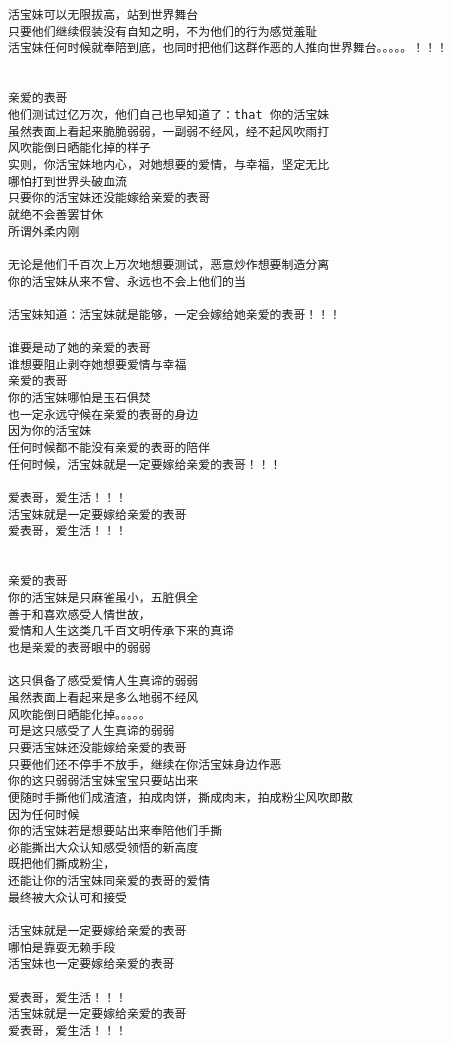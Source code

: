 \documentclass[9pt, b5paper]{article}
\begin{document}
\begin{enumerate}
\begin{verbatim}
活宝妹可以无限拔高，站到世界舞台
只要他们继续假装没有自知之明，不为他们的行为感觉羞耻
活宝妹任何时候就奉陪到底，也同时把他们这群作恶的人推向世界舞台。。。。。！！！


亲爱的表哥
他们测试过亿万次，他们自己也早知道了：that 你的活宝妹
虽然表面上看起来脆脆弱弱，一副弱不经风，经不起风吹雨打
风吹能倒日晒能化掉的样子
实则，你活宝妹地内心，对她想要的爱情，与幸福，坚定无比
哪怕打到世界头破血流
只要你的活宝妹还没能嫁给亲爱的表哥
就绝不会善罢甘休
所谓外柔内刚

无论是他们千百次上万次地想要测试，恶意炒作想要制造分离
你的活宝妹从来不曾、永远也不会上他们的当

活宝妹知道：活宝妹就是能够，一定会嫁给她亲爱的表哥！！！

谁要是动了她的亲爱的表哥
谁想要阻止剥夺她想要爱情与幸福
亲爱的表哥
你的活宝妹哪怕是玉石俱焚
也一定永远守候在亲爱的表哥的身边
因为你的活宝妹
任何时候都不能没有亲爱的表哥的陪伴
任何时候，活宝妹就是一定要嫁给亲爱的表哥！！！

爱表哥，爱生活！！！
活宝妹就是一定要嫁给亲爱的表哥
爱表哥，爱生活！！！


亲爱的表哥
你的活宝妹是只麻雀虽小，五脏俱全
善于和喜欢感受人情世故，
爱情和人生这类几千百文明传承下来的真谛
也是亲爱的表哥眼中的弱弱

这只俱备了感受爱情人生真谛的弱弱
虽然表面上看起来是多么地弱不经风
风吹能倒日晒能化掉。。。。。
可是这只感受了人生真谛的弱弱
只要活宝妹还没能嫁给亲爱的表哥
只要他们还不停手不放手，继续在你活宝妹身边作恶
你的这只弱弱活宝妹宝宝只要站出来
便随时手撕他们成渣渣，拍成肉饼，撕成肉末，拍成粉尘风吹即散
因为任何时候
你的活宝妹若是想要站出来奉陪他们手撕
必能撕出大众认知感受领悟的新高度
既把他们撕成粉尘，
还能让你的活宝妹同亲爱的表哥的爱情
最终被大众认可和接受

活宝妹就是一定要嫁给亲爱的表哥
哪怕是靠耍无赖手段
活宝妹也一定要嫁给亲爱的表哥

爱表哥，爱生活！！！
活宝妹就是一定要嫁给亲爱的表哥
爱表哥，爱生活！！！
\end{verbatim}
\end{enumerate}
\end{document}
